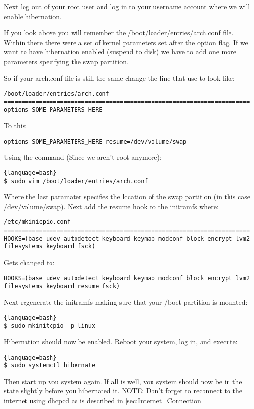 Next log out of your root user and log in to your username account where we will enable hibernation.

If you look above you will remember the /boot/loader/entries/arch.conf file. Within there there were a set of kernel parameters set after the option flag. If we want to have hibernation enabled (suspend to disk) we have to add one more parameters specifying the swap partition.

So if your arch.conf file is still the same change the line that use to look like:
\begin{verbatim}
/boot/loader/entries/arch.conf
======================================================================
options SOME_PARAMETERS_HERE
\end{verbatim}
To this:
\begin{verbatim}
options SOME_PARAMETERS_HERE resume=/dev/volume/swap
\end{verbatim}
Using the command (Since we aren't root anymore):
\begin{lstlisting}{language=bash}
$ sudo vim /boot/loader/entries/arch.conf
\end{lstlisting}
Where the last paramater specifies the location of the swap partition (in this case /dev/volume/swap).
Next add the resume hook to the initramfs where:
\begin{verbatim}
/etc/mkinicpio.conf
======================================================================
HOOKS=(base udev autodetect keyboard keymap modconf block encrypt lvm2 filesystems keyboard fsck)
\end{verbatim}
Gets changed to:
\begin{verbatim}
HOOKS=(base udev autodetect keyboard keymap modconf block encrypt lvm2 filesystems keyboard resume fsck)
\end{verbatim}
Next regenerate the initramfs making sure that your /boot partition is mounted:
\begin{lstlisting}{language=bash}
$ sudo mkinitcpio -p linux
\end{lstlisting}

Hibernation should now be enabled. Reboot your system, log in, and execute:
\begin{lstlisting}{language=bash}
$ sudo systemctl hibernate
\end{lstlisting}
Then start up you system again. If all is well, you system should now be in the state slightly before you hibernated it.
NOTE: Don't forget to reconnect to the internet using dhcpcd as is described in \ref{sec:Internet_Connection}

